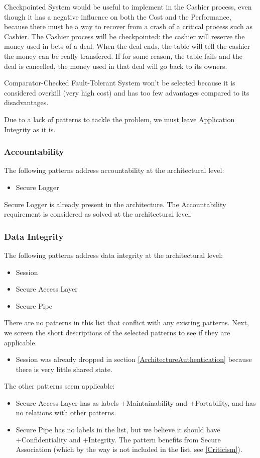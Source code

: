 \documentclass[a4paper,11pt]{report}
\begin{document}
Checkpointed System would be useful to implement in the Cashier process, even though it has a negative influence on both the Cost and the Performance,
because there must be a way to recover from a crash of a critical process such as Cashier. The Cashier process
will be checkpointed: the cashier will reserve the money used in bets of a deal. When the deal ends, the table
will tell the cashier the money can be really transfered. If for some reason, the table fails and the deal is
cancelled, the money used in that deal will go back to its owners.


Comparator-Checked Fault-Tolerant System won't be selected because it is considered overkill (very high cost) and has too few
advantages compared to its disadvantages.

Due to a lack of patterns to tackle the problem, we must leave Application Integrity as it is.

\subsubsection{Accountability}

The following patterns address accountability at the architectural level:

\begin{itemize}
\item Secure Logger
\end{itemize}
Secure Logger is already present in the architecture. The Accountability requirement is considered as solved at the architectural level.

\subsubsection{Data Integrity}
The following patterns address data integrity at the architectural level:
\begin{itemize}
\item Session
\item Secure Access Layer
\item Secure Pipe
\end{itemize}

There are no patterns in this list that conflict with any existing patterns.
Next, we screen the short descriptions of the selected patterns to see if they are applicable.
\begin{itemize}
\item Session was already dropped in section \ref{ArchitectureAuthentication} because there is very little
shared state.
\end{itemize}
The other patterns seem applicable:
\begin{itemize}
\item Secure Access Layer has as labels +Maintainability and +Portability, and has no relations with other patterns.

\item Secure Pipe has no labels in the list, but we believe it should have +Confidentiality and +Integrity. The pattern
benefits from Secure Association (which by the way is not included in the list, see \ref{Criticism}).
\end{itemize}
\end{document}
